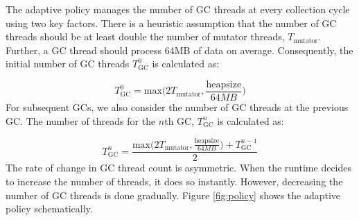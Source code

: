 The adaptive policy manages the number of GC threads 
at every collection cycle using two key factors.
There is a heuristic assumption that the number of GC threads should be
at least double the number of mutator threads, $T_\mathrm{mutator}$.
Further, a GC thread should process 64MB of data on average.
Consequently, the initial number of GC threads $T_\mathrm{GC}^0$
is calculated as:

\begin{equation}
T_\mathrm{GC}^0 = \mathrm{max} \big( 2T_\mathrm{mutator}, \frac{\mathrm{heapsize}}{64MB} \big)
\end{equation}
For subsequent GCs, we also consider the number of GC threads at the previous GC. The number of threads for the $n$th GC, $T_\mathrm{GC}^n$ is
calculated as:

\begin{equation}
T_\mathrm{GC}^n = \frac{\mathrm{max} \big( 2T_\mathrm{mutator}, \frac{\mathrm{heapsize}}{64MB} \big) + T_\mathrm{GC}^{n-1}}{2}
\end{equation}
The rate of change in GC thread count is asymmetric.
When the runtime decides to increase the number of threads, it does so 
instantly. 
However, decreasing the number of GC threads is done gradually.
Figure \ref{fig:policy} shows the adaptive policy schematically.
